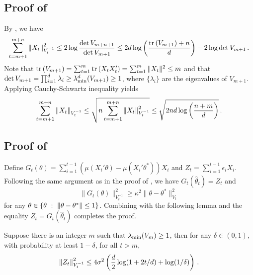 \subsection{Proof of }

By \citet[Lemma~11]{abbasi2011improved}, we have
$$ \sum_{t=m+1}^{m+n} \left\|X_t\right\|_{V_{t}^{-1}}^2 
\le 2 \log \frac{\det V_{m+n+1}}{\det V_{m+1}} 
\le 2 d \log \left( \frac{\textrm{tr}\left(V_{m+1}\right) + n}{d} \right) - 2 \log \det V_{m+1}\,. $$
Note that $\textrm{tr}\left(V_{m+1}\right) = \sum_{t=1}^{m} \textrm{tr}\left(X_tX_t'\right) = \sum_{t=1}^{m} \|X_t\|^2 \le m$ and that $\det V_{m+1} = \prod_{i=1}^{d} \lambda _i \ge \lambda_{\min}^d(V_{m+1}) \ge 1$, where $\{\lambda_i\}$ are the eigenvalues of $V_{m+1}$. Applying Cauchy-Schwartz inequality yields
$$ \sum_{t=m+1}^{m+n} \left\|X_t\right\|_{V_{t}^{-1}} \le \sqrt{n \sum_{t=m+1}^{m+n} \left\|X_t\right\|_{V_{t}^{-1}}^2} \le \sqrt{2nd \log {\left(\frac{n+m}{d} \right)}}\,. $$

\subsection{Proof of }

Define $G_t(\theta) = \sum_{i=1}^{t-1}(\mu(X_i'\theta)-\mu(X_i'\theta^*))X_i$ and $Z_t=\sum_{i=1}^{t-1}\epsilon_i X_i$. Following the same argument as in the proof of , we have $G_t(\hat{\theta}_t)=Z_t$ and
\begin{equation} \label{eq:aaa}
\|G_t(\theta)\|_{V_t^{-1}}^2 \ge \kappa^2 \|\theta-\theta^*\|_{V_t}^2 
\end{equation}
for any $\theta \in \{\theta~:~\left\|\theta-\theta^*\right\| \le 1\}$.  Combining  with the following lemma and the equality $Z_t=G_t(\hat{\theta}_t)$ completes the proof.

\begin{lemma} \label{lm:self}
Suppose there is an integer $m$ such that $\lambda_{\min}(V_m) \ge 1$, then for any $\delta \in (0,1)$, with probability at least $1-\delta$, for all $t>m$,
\[
\left\|Z_t\right\|_{V_t^{-1}}^2 \le 4 \sigma^2 \left(\frac{d}{2} \log(1+2t/d) + \log(1/\delta) \right) \,. \]
\end{lemma}

